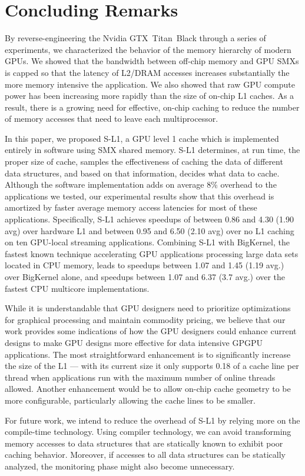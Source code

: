\section{Concluding Remarks}
\label{sec:conclusion}

By reverse-engineering the Nvidia GTX~Titan~Black through a series of experiments, we characterized the behavior of the memory hierarchy of modern GPUs.
We showed that the bandwidth between off-chip memory and GPU SMXs is capped so that the latency of L2/DRAM accesses increases substantially the more memory intensive the application.
We also showed that raw GPU compute power has been increasing more rapidly than the size of on-chip
L1 caches.
As a result, there is a growing need for effective, on-chip caching to reduce the number of memory
accesses that need to leave each multiprocessor.

In this paper, we proposed S-L1, a GPU level 1 cache which is implemented entirely in software using SMX shared memory.
S-L1 determines, at run time, the proper size of cache, samples the effectiveness of caching the data of different data structures, and based on that information, decides what data to cache.
Although the software implementation adds on average 8\% overhead to the applications we tested, our experimental results show that this overhead is amortized by faster average memory access latencies for most of these applications.
Specifically, S-L1 achieves speedups of between 0.86 and 4.30 (1.90 avg) over hardware L1 and between 0.95 and 6.50 (2.10 avg) over no L1 caching on ten GPU-local streaming applications.
Combining S-L1 with BigKernel, the fastest known technique accelerating GPU applications processing
large data sets located in CPU memory, leads to speedups between 1.07 and 1.45 (1.19 avg.) over
BigKernel alone, and speedups between 1.07 and 6.37 (3.7 avg.) over the fastest CPU multicore implementations.

While it is understandable that GPU designers need to prioritize optimizations for graphical
processing and maintain commodity pricing, we believe that our work provides some indications of how
the GPU designers could enhance current designs to make GPU designs more effective for data
intensive GPGPU applications.
The most straightforward enhancement is to significantly increase the size of the L1 --- with its current size it 
only supports 0.18 of a cache line per thread when applications run with the maximum number of online threads allowed.
Another enhancement would be to allow on-chip cache geometry to be more configurable, particularly allowing the cache
lines to be smaller.


For future work,  we intend to reduce the overhead of S-L1 by relying more on the compile-time technology. 
Using compiler technology, we can avoid transforming memory accesses to data structures that are statically known to exhibit poor caching behavior. 
Moreover, if accesses to all data structures can be statically analyzed, the monitoring phase might also become unnecessary.

